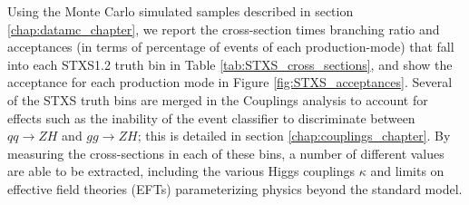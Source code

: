 Using the Monte Carlo simulated samples described in section \ref{chap:datamc_chapter}, we report the cross-section times branching ratio and acceptances (in terms of percentage of events of each production-mode) that fall into each STXS1.2 truth bin in Table \ref{tab:STXS_cross_sections}, and show the acceptance for each production mode in Figure \ref{fig:STXS_acceptances}. Several of the STXS truth bins are merged in the Couplings analysis to account for effects such as the inability of the event classifier to discriminate between $qq \rightarrow ZH$ and $gg \rightarrow ZH$; this is detailed in section \ref{chap:couplings_chapter}. By measuring the cross-sections in each of these bins, a number of different values are able to be extracted, including the various Higgs couplings $\kappa$ and limits on effective field theories (EFTs) parameterizing physics beyond the standard model.

